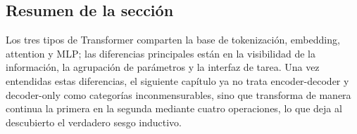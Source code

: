 \subsection{Resumen de la sección}

Los tres tipos de Transformer comparten la base de tokenización, embedding, attention y MLP; las diferencias principales están en la visibilidad de la información, la agrupación de parámetros y la interfaz de tarea. Una vez entendidas estas diferencias, el siguiente capítulo ya no trata encoder-decoder y decoder-only como categorías inconmensurables, sino que transforma de manera continua la primera en la segunda mediante cuatro operaciones, lo que deja al descubierto el verdadero sesgo inductivo.
